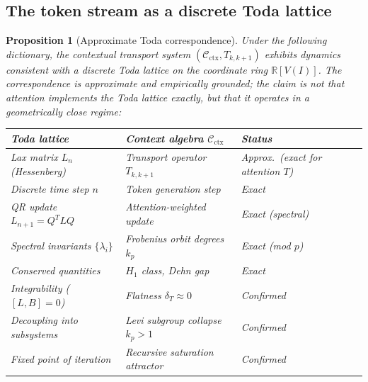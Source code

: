 \documentclass[11pt]{amsart}
\newtheorem{proposition}[theorem]{Proposition}
\theoremstyle{definition}
\begin{document}
\subsection{The token stream as a discrete Toda lattice}

\begin{proposition}[Approximate Toda correspondence]
\label{prop:toda}
Under the following dictionary, the contextual transport system
$(\mathcal{C}_{\mathrm{ctx}}, T_{k,k+1})$ exhibits dynamics
\emph{consistent with} a discrete Toda lattice on the coordinate
ring $\mathbb{R}[V(I)]$.
The correspondence is approximate and empirically grounded;
the claim is not that attention \emph{implements} the Toda lattice
exactly, but that it \emph{operates in a geometrically close regime}:
\begin{center}
\renewcommand{\arraystretch}{1.2}
\begin{tabular}{@{}lll@{}}
\toprule
Toda lattice & Context algebra $\mathcal{C}_{\mathrm{ctx}}$ & Status \\
\midrule
Lax matrix $L_n$ (Hessenberg) & Transport operator $T_{k,k+1}$ & Approx.\ (exact for attention $T$) \\
Discrete time step $n$ & Token generation step & Exact \\
QR update $L_{n+1} = Q^T L Q$ & Attention-weighted update & Exact (spectral) \\
Spectral invariants $\{\lambda_i\}$ & Frobenius orbit degrees $k_p$ & Exact (mod $p$) \\
Conserved quantities & $H_1$ class, Dehn gap & Exact \\
Integrability ($[L,B]=0$) & Flatness $\delta_T \approx 0$ & Confirmed \\
Decoupling into subsystems & Levi subgroup collapse $k_p > 1$ & Confirmed \\
Fixed point of iteration & Recursive saturation attractor & Confirmed \\
\bottomrule
\end{tabular}
\end{center}
\end{proposition}
\end{document}
